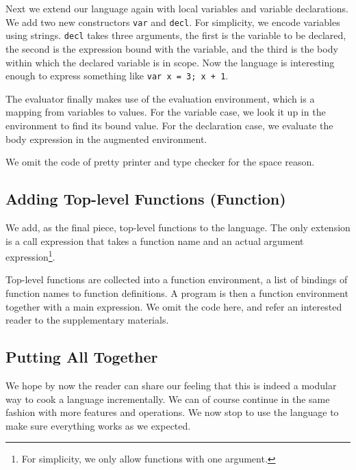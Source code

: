 Next we extend our language again with local variables and variable
declarations. We add two new constructors \lstinline{var} and \lstinline{decl}.
For simplicity, we encode variables using strings. \lstinline{decl} takes three
arguments, the first is the variable to be declared, the second is the
expression bound with the variable, and the third is the body within which the
declared variable is in scope. Now the language is interesting enough to express
something like \lstinline{var x = 3; x + 1}.

The evaluator finally makes use of the evaluation environment, which is a
mapping from variables to values.
For the variable case, we look it up in the environment to find its bound value.
For the declaration case, we evaluate the body expression in the augmented
environment.

We omit the code of pretty printer and type checker for the space reason.

\subsection{Adding Top-level Functions (Function)}

We add, as the final piece, top-level functions to the language. The only
extension is a call expression that takes a function name and an actual
argument expression\footnote{For simplicity, we only allow functions with one
  argument.}.

Top-level functions are collected into a function environment, a list of
bindings of function names to function definitions. A program is then a function
environment together with a main expression. We omit the code here, and refer an
interested reader to the supplementary materials.


\subsection{Putting All Together}

We hope by now the reader can share our feeling that this is indeed a modular
way to cook a language incrementally. We can of course continue in the same
fashion with more features and operations. We now stop to use the language to
make sure everything works as we expected.

